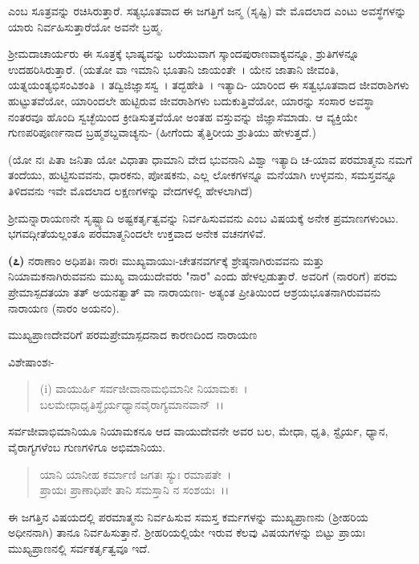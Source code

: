 ಎಂಬ ಸೂತ್ರವನ್ನು ರಚಿಸಿರುತ್ತಾರೆ. ಸತ್ಯಭೂತವಾದ ಈ ಜಗತ್ತಿಗೆ ಜನ್ಮ (ಸೃಷ್ಟಿ) ವೇ ಮೊದಲಾದ ಎಂಟು ಅವಸ್ಥೆಗಳನ್ನು ಯಾರು ನಿರ್ವಹಿಸುತ್ತಾರೆಯೋ ಅವನೇ ಬ್ರಹ್ಮ.

ಶ‍್ರೀಮದಾಚಾರ್ಯರು ಈ ಸೂತ್ರಕ್ಕೆ ಭಾಷ್ಯವನ್ನು ಬರೆಯುವಾಗ ಸ್ಕಾಂದಪುರಾಣವಾಕ್ಯವನ್ನೂ, ಶ್ರುತಿಗಳನ್ನೂ ಉದಹರಿಸಿರುತ್ತಾರೆ. (ಯತೋ ವಾ ಇಮಾನಿ ಭೂತಾನಿ ಜಾಯಂತೇ~। ಯೇನ ಜಾತಾನಿ ಜೀವಂತಿ, ಯತ್ನಯಂತ್ಯಭಿಸಂವಿಶಂತಿ~। ತದ್ವಿಜಿಜ್ಞಾಸಸ್ವ~। ತದ್ಭಹೇತಿ~। ಇತ್ಯಾದಿ- ಯಾರಿಂದ ಈ ಸತ್ವಭೂತವಾದ ಜೀವರಾಶಿಗಳು ಹುಟ್ಟುತವೆಯೋ, ಯಾರಿಂದಲೇ ಹುಟ್ಟಿರುವ ಜೀವರಾಶಿಗಳು ಬದುಕುತ್ತಿವೆಯೋ, ಯಾರನ್ನು ಸಂಸಾರ ಅವಸ್ಥಾ ನಂತರವೂ ಹೊಂದಿ ಸ್ವಚ್ಛೆಯಿಂದ ಕ್ರೀಡಿಸುತ್ತವೆಯೋ ಅಂತಹ ವಸ್ತುವನ್ನು ಜಿಜ್ಞಾಸೆಮಾಡು. ಆ ವ್ಯಕ್ತಿಯೇ ಗುಣಪರಿಪೂರ್ಣನಾದ ಬ್ರಹ್ಮಶಬ್ದವಾಚ್ಯನು- (ಹೀಗೆಂದು ತೈತ್ತಿರೀಯ ಶ್ರುತಿಯು ಹೇಳುತ್ತದೆ.)

(ಯೋ ನಃ ಪಿತಾ ಜನಿತಾ ಯೋ ವಿಧಾತಾ ಧಾಮಾನಿ ವೇದ ಭುವನಾನಿ ವಿಶ್ವಾ ಇತ್ಯಾದಿ ಚ-ಯಾವ ಪರಮಾತ್ಮನು ನಮಗೆ ತಂದೆಯು, ಹುಟ್ಟಿಸುವವನು, ಧಾರಕನು, ಪೋಷಕನು, ಎಲ್ಲ ಲೋಕಗಳನ್ನೂ ಮನೆಯಾಗಿ ಉಳ್ಳವನು, ಸಮಸ್ತವನ್ನೂ ತಿಳಿದವನು ಇವೇ ಮೊದಲಾದ ಲಕ್ಷಣಗಳನ್ನು ವೇದಗಳಲ್ಲಿ ಹೇಳಲಾಗಿದೆ)

ಶ‍್ರೀಮನ್ನಾರಾಯಣನೇ ಸೃಷ್ಟ್ಯಾದಿ ಅಷ್ಟಕರ್ತೃತ್ವವನ್ನು ನಿರ್ವಹಿಸುವವನು ಎಂಬ ವಿಷಯಕ್ಕೆ ಅನೇಕ ಪ್ರಮಾಣಗಳುಂಟು. ಭಗವದ್ಗೀತೆಯಲ್ಲಂತೂ ಪರಮಾತ್ಮನಿಂದಲೇ ಉಕ್ತವಾದ ಅನೇಕ ವಚನಗಳಿವೆ.

\textbf{(೭)} ನರಾಣಾಂ ಅಧಿಪತಿಃ ನಾರಃ ಮುಖ್ಯವಾಯುಃ-ಚೇತನವರ್ಗಕ್ಕೆ ಶ್ರೇಷ್ಠನಾಗಿರುವವನು ಮತ್ತು ನಿಯಾಮಕನಾಗಿರುವವನು ಮುಖ್ಯ ವಾಯುದೇವರು "ನಾರ" ಎಂದು ಹೇಳಲ್ಪಡುತ್ತಾರೆ. ಅವರಿಗೆ (ನಾರರಿಗೆ) ಪರಮ ಪ್ರೇಮಾಸ್ಪದತಯಾ ತತ್ ಅಯನತ್ವಾತ್ ವಾ ನಾರಾಯಣಃ- ಅತ್ಯಂತ ಪ್ರೀತಿಯಿಂದ ಆಶ್ರಯಭೂತನಾಗಿರುವವನು ನಾರಾಯಣ (ನಾರಂ ಅಯನಂ).

\begin{center}
ಮುಖ್ಯಪ್ರಾಣದೇವರಿಗೆ ಪರಮಪ್ರೇಮಾಸ್ಪದನಾದ ಕಾರಣದಿಂದ ನಾರಾಯಣ
\end{center}

\noindent
ವಿಶೇಷಾಂಶಃ-

\begin{verse}
(i) ವಾಯುರ್ಹಿ ಸರ್ವಜೀವಾನಾಮಭಿಮಾನೀ ನಿಯಾಮಕಃ~।\\ ಬಲಮೇಧಾಧೃತಿಸ್ಥೈರ್ಯಧ್ಯಾನವೈರಾಗ್ಯಮಾನವಾನ್~।।
\end{verse}


ಸರ್ವಜೀವಾಭಿಮಾನಿಯೂ ನಿಯಾಮಕನೂ ಆದ ವಾಯುದೇವನೇ ಅವರ ಬಲ, ಮೇಧಾ, ಧೃತಿ, ಸ್ಟೈರ್ಯ, ಧ್ಯಾನ, ವೈರಾಗ್ಯಗಳೆಂಬ ಗುಣಗಳಿಗೂ ಅಭಿಮಾನಿಯು.

\begin{verse}
ಯಾನಿ ಯಾನೀಹ ಕರ್ಮಾಣಿ ಜಗತಃ ಸ್ಯುಃ ರಮಾಪತೇ~।\\ ಪ್ರಾಯಃ ಪ್ರಾಣಾಧಿಪೇ ತಾನಿ ಸಮಸ್ತಾನಿ ನ ಸಂಶಯಃ~।।
\end{verse}


ಈ ಜಗತ್ತಿನ ವಿಷಯದಲ್ಲಿ ಪರಮಾತ್ಮನು ನಿರ್ವಹಿಸುವ ಸಮಸ್ತ ಕರ್ಮಗಳನ್ನು ಮುಖ್ಯಪ್ರಾಣನು (ಶ‍್ರೀಹರಿಯ ಅಧೀನನಾಗಿ) ತಾನೂ ನಿರ್ವಹಿಸುತ್ತಾನೆ. ಶ‍್ರೀಹರಿಯಲ್ಲಿಯೇ ಇರುವ ಕೆಲವು ವಿಷಯಗಳನ್ನು ಬಿಟ್ಟು ಪ್ರಾಯಃ ಮುಖ್ಯಪ್ರಾಣನಲ್ಲಿ ಸರ್ವಕರ್ತೃತ್ವವೂ ಇದೆ.


